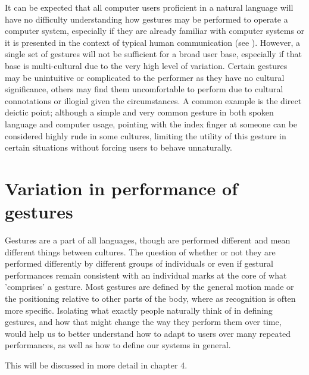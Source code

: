 It can be expected that all computer users proficient in a natural language will have no difficulty understanding how gestures may be performed to operate a computer system, especially if they are already familiar with computer systems or it is presented in the context of typical human communication (see \cite{Cassel1988}). However, a single set of gestures will not be sufficient for a broad user base, especially if that base is multi-cultural due to the very high level of variation. Certain gestures may be unintuitive or complicated to the performer as they have no cultural significance, others may find them uncomfortable to perform due to cultural connotations or illogial given the circumstances. A common example is the direct deictic point; although a simple and very common gesture in both spoken language and computer usage, pointing with the index finger at someone can be considered highly rude in some cultures, limiting the utility of this gesture in certain situations without forcing users to behave unnaturally.

\section{Variation in performance of gestures}
\label{sec:natural-variation}

Gestures are a part of all languages, though are performed different and mean different things between cultures. The question of whether or not they are performed differently by different groups of individuals or even if gestural performances remain consistent with an individual marks at the core of what 'comprises' a gesture. Most gestures are defined by the general motion made or the positioning relative to other parts of the body, where as recognition is often more specific. Isolating what exactly people naturally think of in defining gestures, and how that might change the way they perform them over time, would help us to better understand how to adapt to users over many repeated performances, as well as how to define our systems in general.

This will be discussed in more detail in chapter 4.





